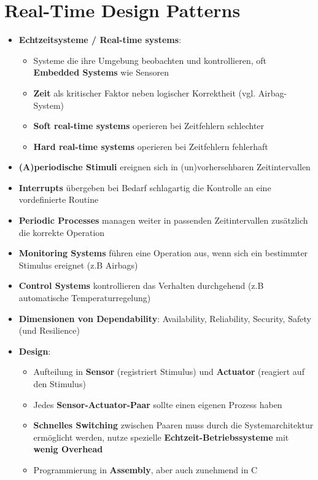 \section{Real-Time Design Patterns}
\label{rtdp:sec:real_time_design_patterns}

\begin{itemize}
	\item \textbf{Echtzeitsysteme / Real-time systems}:
	\begin{itemize}
		\item Systeme die ihre Umgebung beobachten und kontrollieren, oft \textbf{Embedded Systems} wie Sensoren
		\item \textbf{Zeit} als kritischer Faktor neben logischer Korrektheit (vgl. Airbag-System)
		\item \textbf{Soft real-time systems} operieren bei Zeitfehlern schlechter
		\item \textbf{Hard real-time systems} operieren bei Zeitfehlern fehlerhaft
	\end{itemize}
	\item \textbf{(A)periodische Stimuli} ereignen sich in (un)vorhersehbaren Zeitintervallen
	\item \textbf{Interrupts} übergeben bei Bedarf schlagartig die Kontrolle an eine vordefinierte Routine
	\item \textbf{Periodic Processes} managen weiter in passenden Zeitintervallen zusätzlich die korrekte Operation
	\item \textbf{Monitoring Systems} führen eine Operation aus, wenn sich ein bestimmter Stimulus ereignet (z.B Airbags)
	\item \textbf{Control Systems} kontrollieren das Verhalten durchgehend (z.B automatische Temperaturregelung)
	\item \textbf{Dimensionen von Dependability}: Availability, Reliability, Security, Safety (und Resilience)
	\item \textbf{Design}:
	\begin{itemize}
		\item Aufteilung in \textbf{Sensor} (registriert Stimulus) und \textbf{Actuator} (reagiert auf den Stimulus)
		\item Jedes \textbf{Sensor-Actuator-Paar} sollte einen eigenen Prozess haben
		\item \textbf{Schnelles Switching} zwischen Paaren muss durch die Systemarchitektur ermöglicht werden, nutze spezielle \textbf{Echtzeit-Betriebssysteme} mit \textbf{wenig Overhead}
		\item Programmierung in \textbf{Assembly}, aber auch zunehmend in C

\end{itemize}
\end{itemize}
